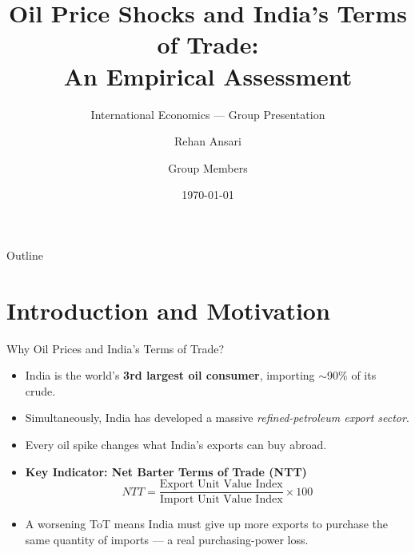 \documentclass[10pt,aspectratio=169]{beamer}
\title[Oil Price Shocks \& India's ToT]{Oil Price Shocks and India's Terms of Trade:\\An Empirical Assessment}
\subtitle{International Economics --- Group Presentation}
\author{Rehan Ansari \and Group Members}
\institute{Summer 2026}
\date{\today}
\begin{document}
\begin{frame}
  \titlepage
\end{frame}

\begin{frame}{Outline}
  \tableofcontents
\end{frame}

\section{Introduction and Motivation}

\begin{frame}{Why Oil Prices and India's Terms of Trade?}
  \begin{itemize}
    \item India is the world's \textbf{3rd largest oil consumer}, importing $\sim$90\% of its crude.
    \item Simultaneously, India has developed a massive \textit{refined-petroleum export sector}.
    \item Every oil spike changes what India's exports can buy abroad.
    \vspace{0.3cm}
    \item \textbf{Key Indicator: Net Barter Terms of Trade (NTT)}
    \begin{equation*}
      NTT = \frac{\text{Export Unit Value Index}}{\text{Import Unit Value Index}} \times 100
    \end{equation*}
    \item A worsening ToT means India must give up more exports to purchase the same quantity of imports --- a real purchasing-power loss.
  \end{itemize}
\end{frame}
\end{document}
